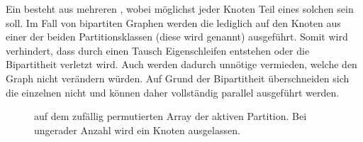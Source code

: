 %
%
%

Ein  besteht aus mehreren , wobei möglichst 
jeder Knoten Teil eines solchen  sein soll. 
Im Fall von bipartiten Graphen werden die  lediglich auf den Knoten 
aus einer der beiden Partitionsklassen (diese wird  genannt) ausgeführt.
Somit wird verhindert, dass durch einen \gc{} Tausch Eigenschleifen entstehen oder
die Bipartitheit verletzt wird. Auch werden dadurch unnötige  vermieden, welche den Graph nicht verändern würden.
Auf Grund der Bipartitheit überschneiden sich 
die einzelnen  %
nicht und können daher vollständig parallel ausgeführt werden.

%
%
% 
\begin{figure}[H]
\centering
  \caption{\gc{} auf dem zufällig permutierten Array der aktiven Partition. Bei ungerader Anzahl wird ein Knoten ausgelassen.}
  \label{fig:global_curveball_trade_vector}
  
\end{figure}
%
%
%

